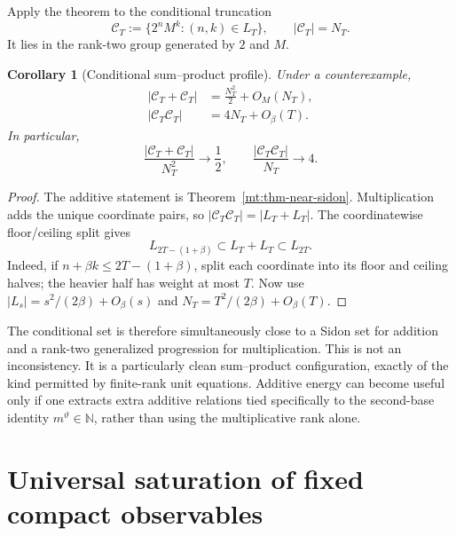 \documentclass[11pt,oneside]{article}
\newtheorem{corollary}[theorem]{Corollary}
\theoremstyle{definition}
\theoremstyle{remark}
\newcommand{\N}{\mathbb N}
\newcommand{\thetaq}{\vartheta}
\newcommand{\Cand}{\mathcal C}
\begin{document}
Apply the theorem to the conditional truncation
\begin{equation}
 \Cand_T:=\{2^nM^k:(n,k)\in L_T\},
 \qquad |\Cand_T|=N_T.
 \label{mt:eq-CandT}
\end{equation}
It lies in the rank-two group generated by $2$ and $M$.

\begin{corollary}[Conditional sum--product profile]
\label{mt:cor-conditional-sumproduct}
Under a counterexample,
\begin{align}
 |\Cand_T+\Cand_T|
   &=\frac{N_T^2}{2}+O_M(N_T),
 \label{mt:eq-CandT-sum}\\
 |\Cand_T\Cand_T|
   &=4N_T+O_\beta(T).
 \label{mt:eq-CandT-product}
\end{align}
In particular,
\begin{equation}
 \frac{|\Cand_T+\Cand_T|}{N_T^2}\longrightarrow\frac12,
 \qquad
 \frac{|\Cand_T\Cand_T|}{N_T}\longrightarrow4.
 \label{mt:eq-sumproduct-ratios}
\end{equation}
\end{corollary}

\begin{proof}
The additive statement is Theorem~\ref{mt:thm-near-sidon}.  Multiplication adds the unique
coordinate pairs, so $|\Cand_T\Cand_T|=|L_T+L_T|$.  The coordinatewise floor/ceiling split gives
\begin{equation}
 L_{2T-(1+\beta)}\subset L_T+L_T\subset L_{2T}.
 \label{mt:eq-Minkowski-sandwich}
\end{equation}
Indeed, if $n+\beta k\le2T-(1+\beta)$, split each coordinate into its floor and ceiling halves;
the heavier half has weight at most $T$.  Now use
$|L_s|=s^2/(2\beta)+O_\beta(s)$ and $N_T=T^2/(2\beta)+O_\beta(T)$.
\end{proof}

The conditional set is therefore simultaneously close to a Sidon set for addition and a
rank-two generalized progression for multiplication.  This is not an inconsistency.  It is a
particularly clean sum--product configuration, exactly of the kind permitted by finite-rank
unit equations.  Additive energy can become useful only if one extracts extra additive
relations tied specifically to the second-base identity $m^{\thetaq}\in\N$, rather than using
the multiplicative rank alone.

\section{Universal saturation of fixed compact observables}
\label{mt:sec-compact-saturation}
\end{document}

